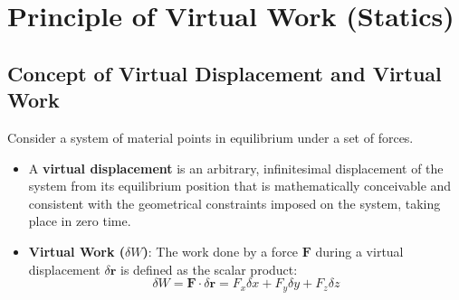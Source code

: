 \chapter{Principle of Virtual Work (Statics)}

\section{Concept of Virtual Displacement and Virtual Work}

\begin{defbox}
Consider a system of material points in equilibrium under a set of forces. 
\begin{itemize}[leftmargin=1.5em]
    \item A \textbf{virtual displacement} is an arbitrary, infinitesimal displacement of the system from its equilibrium position that is mathematically conceivable and consistent with the geometrical constraints imposed on the system, taking place in zero time.
    \item \textbf{Virtual Work ($\delta W$)}: The work done by a force $\mathbf{F}$ during a virtual displacement $\delta \mathbf{r}$ is defined as the scalar product:
    \begin{equation}
        \delta W = \mathbf{F} \cdot \delta \mathbf{r} = F_x \delta x + F_y \delta y + F_z \delta z
    \end{equation}
\end{itemize}

\begin{center}
\end{center}
\end{defbox}

